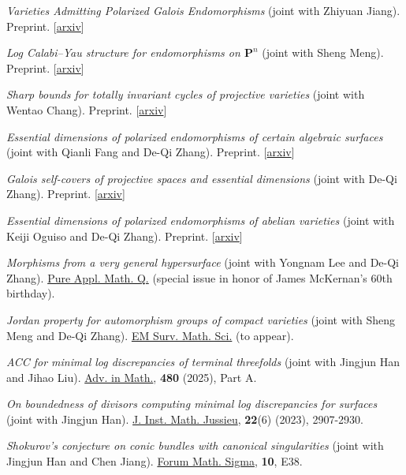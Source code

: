 \documentclass[margin,line,pifont,palatino,courier]{res}
\newenvironment{list1}{
  \begin{list}{\ding{113}}{%
      \setlength{\itemsep}{0in}
      \setlength{\parsep}{0in} \setlength{\parskip}{0in}
      \setlength{\topsep}{0in} \setlength{\partopsep}{0in}
      \setlength{\leftmargin}{0.17in}}}{\end{list}}
\begin{document}
\begin{resume}
\begin{list1}
\item \textit{Varieties Admitting Polarized Galois Endomorphisms} (joint with Zhiyuan Jiang). Preprint. [\href{https://arxiv.org/abs/2610.05248}{arxiv}]
\item \textit{Log Calabi--Yau structure for endomorphisms on $\mathbf{P}^n$} (joint with Sheng Meng). Preprint. [\href{https://arxiv.org/abs/2608.02114}{arxiv}]
\item \textit{Sharp bounds for totally invariant cycles of projective varieties} (joint with Wentao Chang). Preprint. [\href{https://arxiv.org/abs/2607.27738}{arxiv}]
\item \textit{Essential dimensions of polarized endomorphisms of certain algebraic surfaces} (joint with Qianli Fang and De-Qi Zhang). Preprint. [\href{https://arxiv.org/abs/2606.24103}{arxiv}]
\item \textit{Galois self-covers of projective spaces and essential dimensions} (joint with De-Qi Zhang). Preprint. [\href{https://arxiv.org/abs/2606.10207}{arxiv}]
\item \textit{Essential dimensions of polarized endomorphisms of abelian varieties} (joint with Keiji Oguiso and De-Qi Zhang). Preprint. [\href{https://arxiv.org/abs/2512.04942}{arxiv}]
\item \textit{Morphisms from a very general hypersurface} (joint with Yongnam Lee and De-Qi Zhang). \href{https://link.intlpress.com/JFirstDetail/1942307988947648514}{Pure Appl. Math. Q.} (special issue in honor of James McKernan's 60th birthday).
\item \textit{Jordan property for automorphism groups of compact varieties} (joint with Sheng Meng and De-Qi Zhang). \href{https://ems.press/journals/emss/articles/14298864}{EM Surv. Math. Sci.} (to appear).
\item \textit{ACC for minimal log discrepancies of terminal threefolds} (joint with Jingjun Han and Jihao Liu). \href{https://www.sciencedirect.com/science/article/abs/pii/S000187082500355X}{Adv. in Math.}, \textbf{480} (2025), Part A.
\item \textit{On boundedness of divisors computing minimal log discrepancies for surfaces} (joint with Jingjun Han). \href{https://www.cambridge.org/core/journals/journal-of-the-institute-of-mathematics-of-jussieu/article/on-boundedness-of-divisors-computing-minimal-log-discrepancies-for-surfaces/FD39003AD587E4711097363175E6F966}{J. Inst. Math. Jussieu}, \textbf{22}(6) (2023), 2907-2930.
\item \textit{Shokurov's conjecture on conic bundles with canonical singularities} (joint with Jingjun Han and Chen Jiang). \href{https://www.cambridge.org/core/journals/forum-of-mathematics-sigma/article/shokurovs-conjecture-on-conic-bundles-with-canonical-singularities/EC15D79B29D794C1637A2C80EC13DBA8}{Forum Math. Sigma}, \textbf{10}, E38.

\end{list1}
\end{resume}
\end{document}
